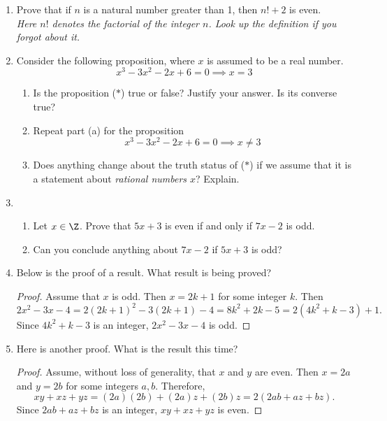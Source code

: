 \begin{enumerate}
	\item Prove that if $n$ is a natural number greater than 1, then $n!+2$ is even.\\[5pt]
  \emph{Here $n!$ denotes the \emph{factorial} of the integer $n$. Look up the definition if you forgot about it.}
  
  \item Consider the following proposition, where $x$ is assumed to be a real number.
	\[x^3-3x^2-2x+6=0\implies x=3\tag*{($\ast$)}\]
	\begin{enumerate}
  	\item Is the proposition ($\ast$) true or false? Justify your answer. Is its converse true?
  	\item Repeat part (a) for the proposition
		\[x^3-3x^2-2x+6=0\implies x\neq 3\]
  	\item Does anything change about the truth status of ($\ast$) if we assume that it is a statement about \emph{rational numbers $x$}? Explain.
	\end{enumerate}
  
	\item\begin{enumerate}
	  \item Let $x\in\Z$. Prove that $5x+3$ is even if and only if $7x-2$ is odd.
	  \item Can you conclude anything about $7x-2$ if $5x+3$ is odd?
	  \end{enumerate}
	  
	\pagebreak[4]
	  
	  
	\item Below is the proof of a result. What result is being proved?
  \begin{proof}
  Assume that $x$ is odd. Then $x=2k+1$ for some integer $k$. Then
  \[2x^2-3x-4=2(2k+1)^2-3(2k+1)-4=8k^2+2k-5=2(4k^2+k-3)+1.\]
  Since $4k^2+k-3$ is an integer, $2x^2-3x-4$ is odd.
  \end{proof}
 
	
	\item Here is another proof. What is the result this time?
  \begin{proof}
  Assume, without loss of generality, that $x$ and $y$ are even. Then $x=2a$ and $y=2b$ for some integers $a,b$. Therefore,
  \[xy+xz+yz=(2a)(2b)+(2a)z+(2b)z=2(2ab+az+bz).\]
  Since $2ab+az+bz$ is an integer, $xy+xz+yz$ is even.
  \end{proof}
	  

\end{enumerate}
